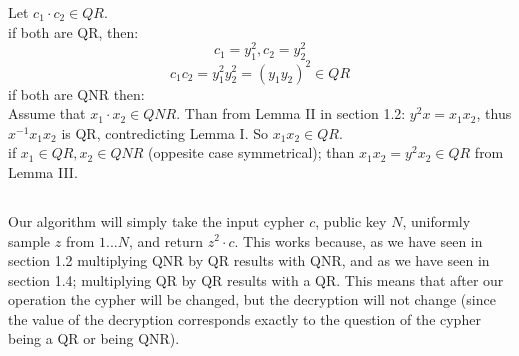 Let $c_1\cdot c_2\in QR$.\\
if both are QR, then:
\[
	c_1=y_1^2,c_2=y_2^2	
\]
\[
	c_1c_2=y_1^2y_2^2=(y_1y_2)^2\in QR	
\]
if both are QNR then:\\
Assume that $x_1\cdot x_2\in QNR$. Than from Lemma II 
in section 1.2: $y^2x=x_1x_2$, thus $x^{-1}x_1x_2$ is 
QR, contredicting Lemma I.
So $x_1x_2\in QR$.\\

if $x_1\in QR, x_2\in QNR$ (oppesite case symmetrical);
than $x_1x_2=y^2x_2\in QR$ from Lemma III.

\subsection{}
Our algorithm will simply take the input cypher $c$, public key $N$,
uniformly sample $z$ from ${1...N}$, and return $z^2\cdot c$.
This works because, as we have seen in section 1.2 multiplying QNR by QR
results with QNR, and as we have seen in section 1.4; multiplying QR by QR 
results with a QR. This means that after our operation the cypher
will be changed, but the decryption will not change (since
the value of the decryption corresponds exactly to the question of the cypher
being a QR or being QNR).



